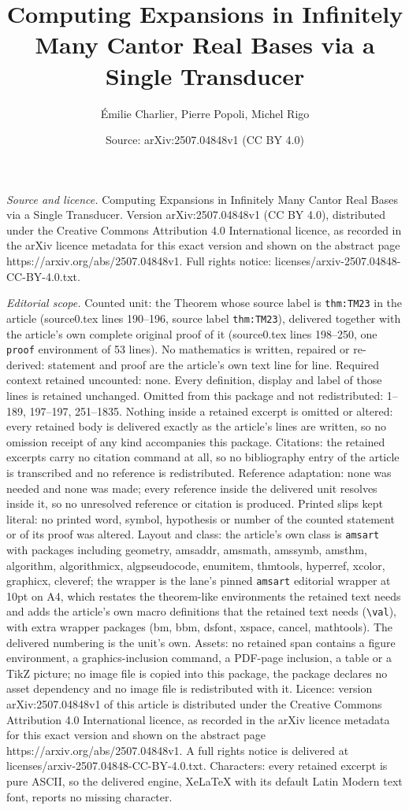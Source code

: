 \documentclass[10pt,a4paper]{amsart}
\title[Computing Expansions in Infinitely Many Cantor Real Bases vi]{Computing Expansions in Infinitely Many Cantor Real Bases via a Single Transducer}
\author{\'Emilie Charlier, Pierre Popoli, Michel Rigo}
\date{Source: arXiv:2507.04848v1 (CC BY 4.0)}
\begin{document}
\maketitle

\noindent\emph{Source and licence.} Computing Expansions in Infinitely Many Cantor Real Bases via a Single Transducer. Version arXiv:2507.04848v1 (CC BY 4.0), distributed under the Creative Commons Attribution 4.0 International licence, as recorded in the arXiv licence metadata for this exact version and shown on the abstract page https://arxiv.org/abs/2507.04848v1. Full rights notice: licenses/arxiv-2507.04848-CC-BY-4.0.txt.\par\smallskip

\noindent\textit{Editorial scope.} Counted unit: the Theorem whose source label is \texttt{thm:TM23} in the article (source0.tex lines 190--196, source label \texttt{thm:TM23}), delivered together with the article's own complete original proof of it (source0.tex lines 198--250, one \texttt{proof} environment of 53 lines). No mathematics is written, repaired or re-derived: statement and proof are the article's own text line for line. Required context retained uncounted: none. Every definition, display and label of those lines is retained unchanged. Omitted from this package and not redistributed: 1--189, 197--197, 251--1835. Nothing inside a retained excerpt is omitted or altered: every retained body is delivered exactly as the article's lines are written, so no omission receipt of any kind accompanies this package. Citations: the retained excerpts carry no citation command at all, so no bibliography entry of the article is transcribed and no reference is redistributed. Reference adaptation: none was needed and none was made; every reference inside the delivered unit resolves inside it, so no unresolved reference or citation is produced. Printed slips kept literal: no printed word, symbol, hypothesis or number of the counted statement or of its proof was altered. Layout and class: the article's own class is \texttt{amsart} with packages including geometry, amsaddr, amsmath, amssymb, amsthm, algorithm, algorithmicx, algpseudocode, enumitem, thmtools, hyperref, xcolor, graphicx, cleveref; the wrapper is the lane's pinned \texttt{amsart} editorial wrapper at 10pt on A4, which restates the theorem-like environments the retained text needs and adds the article's own macro definitions that the retained text needs (\texttt{\textbackslash val}), with extra wrapper packages (bm, bbm, dsfont, xspace, cancel, mathtools). The delivered numbering is the unit's own. Assets: no retained span contains a figure environment, a graphics-inclusion command, a PDF-page inclusion, a table or a TikZ picture; no image file is copied into this package, the package declares no asset dependency and no image file is redistributed with it. Licence: version arXiv:2507.04848v1 of this article is distributed under the Creative Commons Attribution 4.0 International licence, as recorded in the arXiv licence metadata for this exact version and shown on the abstract page https://arxiv.org/abs/2507.04848v1. A full rights notice is delivered at licenses/arxiv-2507.04848-CC-BY-4.0.txt. Characters: every retained excerpt is pure ASCII, so the delivered engine, XeLaTeX with its default Latin Modern text font, reports no missing character.
\end{document}
